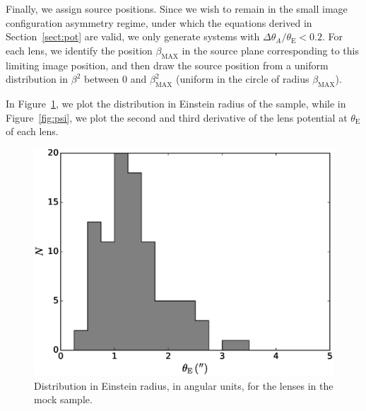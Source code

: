 \documentclass[usenatbib]{mnras}
\def\tein{\theta_{\mathrm{E}}}
\def\Sref#1{Section~\ref{#1}\xspace}
\def\Fref#1{Figure~\ref{#1}\xspace}
\begin{document}
Finally, we assign source positions.
Since we wish to remain in the small image configuration asymmetry regime, under which the equations derived in \Sref{sect:pot} are valid, we only generate systems with $\Delta\theta_A/\tein < 0.2$. For each lens, we identify the position $\beta_{\mathrm{MAX}}$ in the source plane corresponding to this limiting image position, and then draw the source position from a uniform distribution in $\beta^2$ between 0 and $\beta_{\mathrm{MAX}}^2$ (uniform in the circle of radius $\beta_{\mathrm{MAX}}$).

In \Fref{fig:rein}, we plot the distribution in Einstein radius of the sample, while in \Fref{fig:psi}, we plot the second and third derivative of the lens potential at $\tein$ of each lens.
%
\begin{figure}
 \includegraphics[width=\columnwidth]{rein_hist.eps}
 \caption{Distribution in Einstein radius, in angular units, for the lenses in the mock sample.}
 \label{fig:rein}
\end{figure}
%
%
\end{document}
